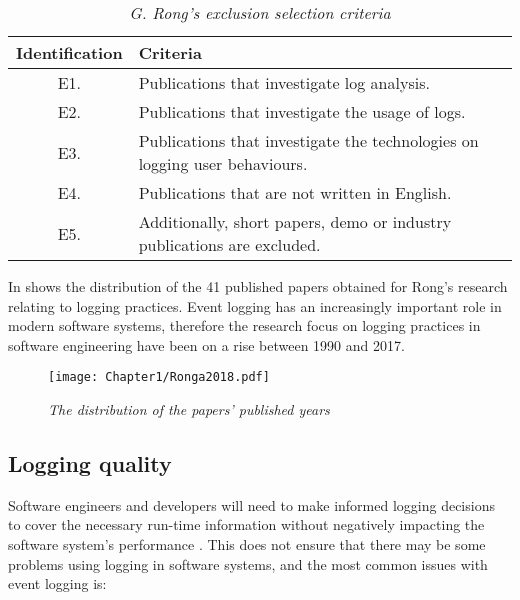 \begin{table}[!htb]
	\centering
	\small
	\caption[G. Rong's exclusion selection criteria]
	{\textit{G. Rong's exclusion selection criteria \cite{Rong2018a}}}
	\label{tbl:CH1_RongExlSelectionCriteria}
	\begin{tabularx}{\textwidth}{|c|X|}
		\hline \textbf{Identification} & \textbf{Criteria} \\
		\hline E1. & Publications that investigate log analysis. \\
		\hline E2. & Publications that investigate the usage of logs. \\
		\hline E3. & Publications that investigate the technologies on logging user behaviours. \\
		\hline E4. & Publications that are not written in English. \\
		\hline E5. & Additionally, short papers, demo or industry publications are excluded. \\
		\hline
	\end{tabularx}
\end{table}

In  shows the distribution of the 41 published papers obtained for Rong's research relating to logging practices. Event logging has an increasingly important role in modern software systems, therefore the research focus on logging practices in software engineering have been on a rise between 1990 and 2017.

\begin{figure}[!htb] %
	\centering %
	\texttt{[image: Chapter1/Ronga2018.pdf]}
	\caption[The distribution of the papers’ published years]
	{\textit{The distribution of the papers’ published years \cite{Rong2018a}}} \label{fig:PushblisedPapers}
\end{figure} 

\subsection{Logging quality}

Software engineers and developers will need to make informed logging decisions to cover the necessary run-time information without negatively impacting the software system's performance \cite{Zhu2015,Zhu2019,Kherbouche2017}. This does not ensure that there may be some problems using logging in software systems, and the most common issues with event logging is:

